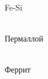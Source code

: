 \documentclass[12pt,a4paper]{article}
\begin{document}
\begin{figure}[h]
\begin{minipage}[h]{0.31\linewidth}
 \\Fe-Si
\end{minipage}
\hfill
\begin{minipage}[h]{0.31\linewidth}
 \\Пермаллой
\end{minipage}
\hfill
\begin{minipage}[h]{0.31\linewidth}
 \\Феррит

\end{minipage}
\end{figure}
\end{document}
